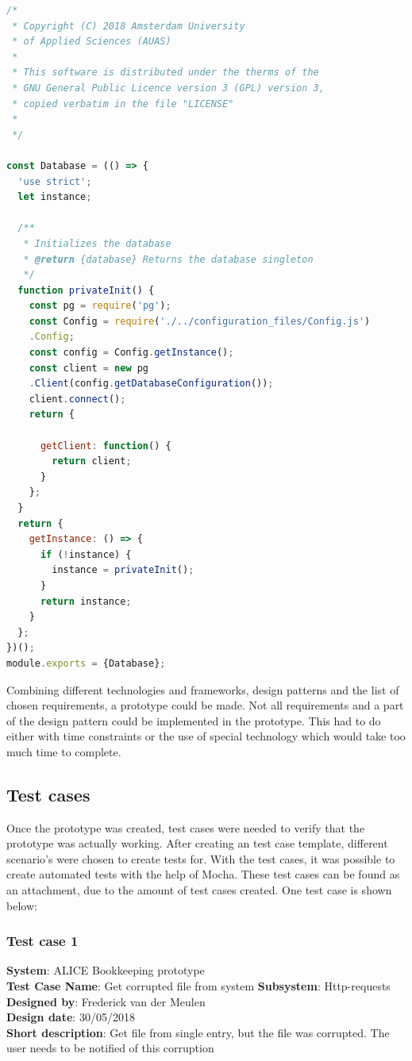 \documentclass[paper=a4, fontsize=11pt,twoside]{scrartcl}	%
\begin{document}
\begin{lstlisting}[language=JavaScript, frame=single]
/*
 * Copyright (C) 2018 Amsterdam University 
 * of Applied Sciences (AUAS)
 *
 * This software is distributed under the therms of the
 * GNU General Public Licence version 3 (GPL) version 3,
 * copied verbatim in the file "LICENSE"
 *
 */

const Database = (() => {
  'use strict';
  let instance;

  /**
   * Initializes the database
   * @return {database} Returns the database singleton
   */
  function privateInit() {
    const pg = require('pg');
    const Config = require('./../configuration_files/Config.js')
    .Config;
    const config = Config.getInstance();
    const client = new pg
    .Client(config.getDatabaseConfiguration());
    client.connect();
    return {

      getClient: function() {
        return client;
      }
    };
  }
  return {
    getInstance: () => {
      if (!instance) {
        instance = privateInit();
      }
      return instance;
    }
  };
})();
module.exports = {Database};
\end{lstlisting} 

Combining different technologies and frameworks, design patterns and the list of chosen requirements, a prototype could be made. Not all requirements and a part of the design pattern could be implemented in the prototype. This had to do either with time constraints or the use of special technology which would take too much time to complete.
\newpage
\subsection{Test cases}
Once the prototype was created, test cases were needed to verify that the prototype was actually working. After creating an test case template, different scenario's were chosen to create tests for. With the test cases, it was possible to create automated tests with the help of Mocha. These test cases can be found as an attachment, due to the amount of test cases created. One test case is shown below:
\subsubsection{Test case 1}
\textbf{System}:  ALICE Bookkeeping prototype \\
\textbf{Test Case Name}:  Get corrupted file from system
\textbf{Subsystem}:  Http-requests
\textbf{Designed by}:  Frederick van der Meulen\\
\textbf{Design date}: 30/05/2018 \\
\textbf{Short description}: Get file from single entry, but the file was corrupted. The user needs to be notified of this corruption \\
\end{document}
